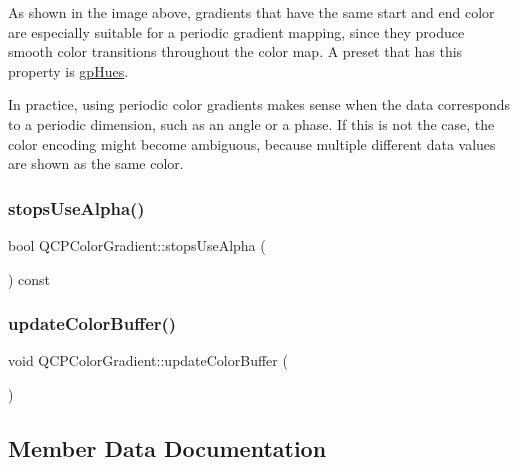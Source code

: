 As shown in the image above, gradients that have the same start and end color are especially suitable for a periodic gradient mapping, since they produce smooth color transitions throughout the color map. A preset that has this property is \hyperlink{class_q_c_p_color_gradient_aed6569828fee337023670272910c9072a30efe58407acfb67939032f70213a130}{gp\+Hues}.

In practice, using periodic color gradients makes sense when the data corresponds to a periodic dimension, such as an angle or a phase. If this is not the case, the color encoding might become ambiguous, because multiple different data values are shown as the same color. \mbox{\label{class_q_c_p_color_gradient_a137b368ea8829a871974add6e4883c71}} 
\subsubsection{\texorpdfstring{stops\+Use\+Alpha()}{stopsUseAlpha()}}
{\footnotesize\ttfamily bool Q\+C\+P\+Color\+Gradient\+::stops\+Use\+Alpha (\begin{DoxyParamCaption}{ }\end{DoxyParamCaption}) const\hspace{0.3cm}{\ttfamily [protected]}}

\mbox{\label{class_q_c_p_color_gradient_a353f15ab3ab586eebf1f6b58c3e2707b}} 
\subsubsection{\texorpdfstring{update\+Color\+Buffer()}{updateColorBuffer()}}
{\footnotesize\ttfamily void Q\+C\+P\+Color\+Gradient\+::update\+Color\+Buffer (\begin{DoxyParamCaption}{ }\end{DoxyParamCaption})\hspace{0.3cm}{\ttfamily [protected]}}



\subsection{Member Data Documentation}
\mbox{\label{class_q_c_p_color_gradient_af8b5f0739faa5f8295154d47ce38ecff}} 
